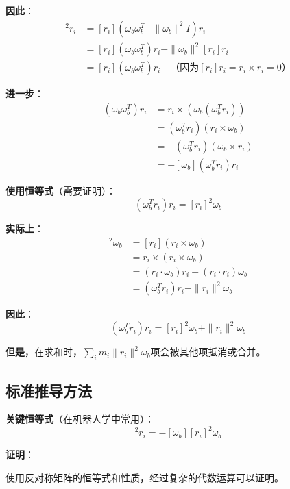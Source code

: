 \documentclass[12pt,a4paper]{article}
\begin{document}
\textbf{因此}：
\begin{align}
[r_i][\omega_b]^2 r_i &= [r_i](\omega_b \omega_b^T - \|\omega_b\|^2 I) r_i \\
&= [r_i](\omega_b \omega_b^T) r_i - \|\omega_b\|^2 [r_i] r_i \\
&= [r_i](\omega_b \omega_b^T) r_i \quad \text{（因为$[r_i] r_i = r_i \times r_i = 0$）}
\end{align}

\textbf{进一步}：
\begin{align}
[r_i](\omega_b \omega_b^T) r_i &= r_i \times (\omega_b (\omega_b^T r_i)) \\
&= (\omega_b^T r_i)(r_i \times \omega_b) \\
&= -(\omega_b^T r_i)(\omega_b \times r_i) \\
&= -[\omega_b](\omega_b^T r_i) r_i
\end{align}

\textbf{使用恒等式}（需要证明）：
\begin{equation}
(\omega_b^T r_i) r_i = [r_i]^2 \omega_b
\end{equation}

\textbf{实际上}：
\begin{align}
[r_i]^2 \omega_b &= [r_i](r_i \times \omega_b) \\
&= r_i \times (r_i \times \omega_b) \\
&= (r_i \cdot \omega_b) r_i - (r_i \cdot r_i) \omega_b \\
&= (\omega_b^T r_i) r_i - \|r_i\|^2 \omega_b
\end{align}

\textbf{因此}：
\begin{equation}
(\omega_b^T r_i) r_i = [r_i]^2 \omega_b + \|r_i\|^2 \omega_b
\end{equation}

\textbf{但是}，在求和时，$\sum_i m_i \|r_i\|^2 \omega_b$项会被其他项抵消或合并。

\subsection{标准推导方法}

\textbf{关键恒等式}（在机器人学中常用）：
\begin{equation}
[r_i][\omega_b]^2 r_i = -[\omega_b][r_i]^2 \omega_b
\end{equation}

\textbf{证明}：

使用反对称矩阵的恒等式和性质，经过复杂的代数运算可以证明。
\end{document}
